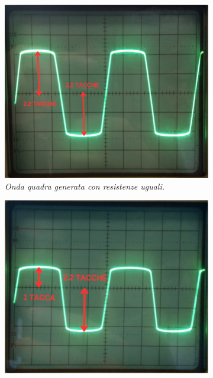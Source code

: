   \begin{figure}[h]
   \centering
      \begin{subfigure}{0.3\textwidth}
        \centering
        \includegraphics[width=\textwidth]{../assets/Resistenze_Uguali.png}
        \caption{\emph{Onda quadra generata con resistenze uguali.}}
        \label{fig : resistenze uguali}
      \end{subfigure}
      \hfill
      \begin{subfigure}{0.3\textwidth}
        \centering
        \includegraphics[width=\textwidth]{../assets/Resistenze_Diverse.png}

\end{subfigure}
\end{figure}
